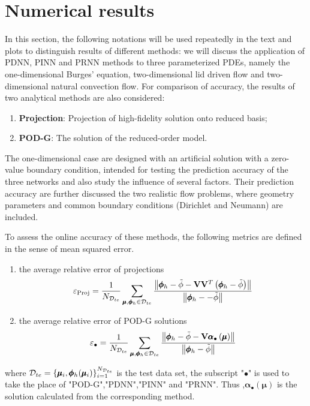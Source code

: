 \documentclass[preprint, 10pt]{elsarticle}
\begin{document}
\section{Numerical results}
In this section, the following notations will be used repeatedly in the text and plots to distinguish results of different methods:
we will discuss the application of PDNN, PINN and PRNN methods to three parameterized PDEs, namely the one-dimensional Burges' equation, two-dimensional lid driven flow and two-dimensional natural convection flow. For comparison of accuracy, the results of two analytical methods are also considered:
\begin{enumerate}[(1)]
\item \textbf{Projection}: Projection of high-fidelity solution onto reduced basis;
\item \textbf{POD-G}: The solution of the reduced-order model.
\end{enumerate}
The one-dimensional case are designed with an artificial solution with a zero-value boundary condition, intended for testing the prediction accuracy of the three networks and also study the influence of several factors. Their prediction accuracy are further discussed the two realistic flow problems, where geometry parameters and common boundary conditions (Dirichlet and Neumann) are included.

To assess the online accuracy of these methods, the following metrics are defined in the sense of mean squared error.
\begin{enumerate}[(1)]
\item the average relative error of  projections
\begin{equation}
\varepsilon_{\rm{Proj}}
=\frac{1}{N_{{\cal D}_{te}}}
\sum\limits_{\pmb\mu ,\pmb{\phi}_h  \in {{\cal D}_{te}}}{
\frac{\left\| \pmb{\phi}_h - \tilde{\phi} -\mathbf{V}\mathbf{V}^T \left( \pmb{\phi}_h - \tilde{\phi} \right)  \right\|}
{\left\| \pmb{\phi}_h - - \tilde{\phi} \right\|}
}
\end{equation}

\item the average relative error of POD-G solutions
\begin{equation}
\varepsilon_{\bullet}
=\frac{1}{N_{{\cal D}_{te}}}
\sum\limits_{\pmb\mu ,\pmb{\phi}_h  \in {{\cal D}_{te}}}{
\frac{\left\| \pmb{\phi}_h- \tilde{\phi}-\mathbf{V}\pmb{\alpha}_{\bullet}\left( \pmb{\mu}\right)
\right\|}
{\left\| \pmb{\phi}_h - \tilde{\phi} \right\|}
}
\end{equation}

\end{enumerate}
where ${{\cal D}_{te}}=\{\pmb{\mu}_i, \pmb{\phi}_h(\pmb{\mu}_i)\}_{i=1}^{N_{{\cal D}_{te}}}$ is the test data set, the subscript "$\bullet$" is used to take the place of "POD-G","PDNN","PINN" and "PRNN". Thus ,$\pmb{\alpha}_{\bullet}\left( \pmb{\mu}\right)$ is the solution calculated from the corresponding method.
\end{document}
